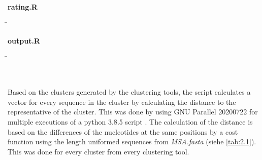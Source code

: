 \begin{leftbar}
\begin{leftbar}
\begin{nstabbing}
                \\
                
                \\
                
            \end{nstabbing}
        \end{leftbar}
        
        \begin{leftbar}
            \textbf{rating.R}
            \begin{nstabbing}
                \qquad \= \kill
                
            \end{nstabbing}
        \end{leftbar}
    
        \begin{leftbar}
            \textbf{output.R}
            \begin{nstabbing}
                \qquad \= \kill
                
                \\
                
            \end{nstabbing}
        \end{leftbar}
    \end{leftbar}    
    
    Based on the clusters generated by the clustering tools, the script calculates a vector for every sequence in the cluster by calculating the distance to the representative of the cluster. This was done by using GNU Parallel 20200722 for multiple executions of a python 3.8.5 script \autocite{Parallel, Python}. The calculation of the distance is based on the differences of the nucleotides at the same positions by a cost function using the length uniformed sequences from \textit{MSA.fasta} (siehe \autoref{tab:2.1}). This was done for every cluster from every clustering tool. 
    
